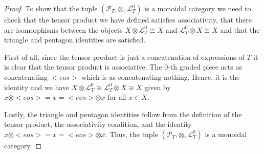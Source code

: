 \documentclass[10pt,a4paper]{amsart}
\renewcommand{\L}{\mathcal{L}}
\renewcommand{\P}{\mathcal{P}}
\begin{document}
\begin{proof}
		To show that the tuple $(\P_{T},\otimes, \L_{T}^{0})$ is a monoidal category we need to check that the tensor product we have defined satisfies associativity, that there are isomorphisms between the objects $X\otimes \L_{T}^{0}\cong X$ and $\L_{T}^{0}\otimes X\cong X$ and that the triangle and pentagon identities are satisfied.
		
		First of all, since the tensor product is just a concatenation of expressions of $T$ it is clear that the tensor product is associative. The $0$-th graded piece acts as concatenating $<eos>$ which is as concatenating nothing. Hence, it is the identity and we have $X\otimes \L_{T}^{0}\cong \L_{T}^{0}\otimes X\cong X$ given by $x\otimes <eos> = x = <eos>\otimes x$ for all $x\in X$.
		
		Lastly, the triangle and pentagon identities follow from the definition of the tensor product, the associativity condition, and the identity $x\otimes <eos> = x = <eos>\otimes x$. Thus, the tuple $(\P_{T},\otimes, \L_{T}^{0})$ is a monoidal category.
	\end{proof}
\end{document}
